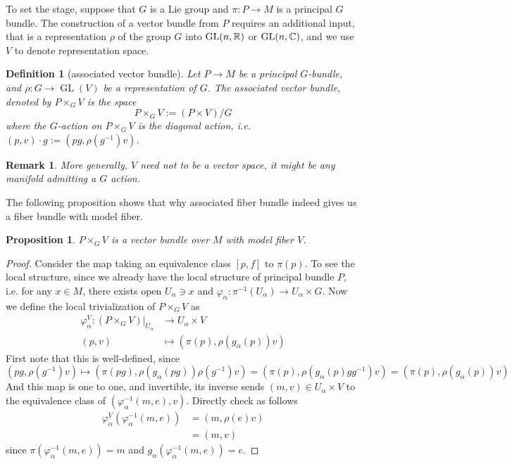 \documentclass[11pt]{amsart}
\numberwithin{equation}{section}
\theoremstyle{plain}
\theoremstyle{plain}
\newtheorem{propsub}[thmsub]{Proposition}
\newtheorem{defnsub}[thmsub]{Definition}
\newtheorem{remksub}[thmsub]{Remark}
\numberwithin{equation}{section}
\begin{document}
To set the stage, suppose that $G$ is a Lie group and $\pi:P\to M$ is a principal $G$ bundle. The construction of a vector bundle from $P$ requires an additional input, that is a representation $\rho$ of the group $G$ into $\operatorname{GL}(n,\Bbb{R})$ or $\operatorname{GL}(n,\Bbb{C})$, and we use $V$ to denote representation space.
\begin{defnsub}[associated vector bundle]
Let $P\to M$ be a principal $G$-bundle, and $\rho:G\to\operatorname{GL}(V)$ be a representation of $G$. The associated vector bundle, denoted by $P\times_GV$ is the space
$$
P\times_{G}V:=(P\times V)/G
$$
where the $G$-action on $P\times_GV$ is the diagonal action, i.e. $(p,v)\cdot g:=(pg,\rho(g^{-1})v)$.
\end{defnsub}
\begin{remksub}\normalfont
More generally, $V$ need not to be a vector space, it might be any manifold admitting a $G$ action.
\end{remksub}
The following proposition shows that why associated fiber bundle indeed gives us a fiber bundle with model fiber.
\begin{propsub}
$P\times_GV$ is a vector bundle over $M$ with model fiber $V$.
\end{propsub}
\begin{proof}
Consider the map taking an equivalence class $[p,f]$ to $\pi(p)$. To see the local structure, since we already have the local structure of principal bundle $P$, i.e. for any $x\in M$, there exists open $U_{\alpha}\ni x$ and $\varphi_{\alpha}:\pi^{-1}(U_{\alpha})\to U_{\alpha}\times G$. Now we define the local trivialization of $P\times_GV$ as 
$$
\begin{aligned}
\varphi^V_{\alpha}:(P\times_GV)|_{U_{\alpha}}&\to U_{\alpha}\times V\\
(p,v)&\mapsto(\pi(p),\rho(g_{\alpha}(p))v)
\end{aligned}
$$ 
First note that this is well-defined, since
$$
(pg,\rho(g^{-1})v)\mapsto(\pi(pg),\rho(g_{\alpha}(pg))\rho(g^{-1})v)=(\pi(p),\rho(g_{\alpha}(p)gg^{-1})v)=(\pi(p),\rho(g_{\alpha}(p))v)
$$
And this map is one to one, and invertible, its inverse sends $(m,v)\in U_{\alpha}\times V$ to the equivalence class of $(\varphi_{\alpha}^{-1}(m,e),v)$. Directly check as follows
$$
\begin{aligned}
\varphi_{\alpha}^V(\varphi^{-1}_{\alpha}(m,e))&=(m,\rho(e)v)\\
&=(m,v)
\end{aligned}
$$
since $\pi(\varphi_{\alpha}^{-1}(m,e))=m$ and $g_{\alpha}(\varphi_{\alpha}^{-1}(m,e))=e$.
\end{proof}
\end{document}
